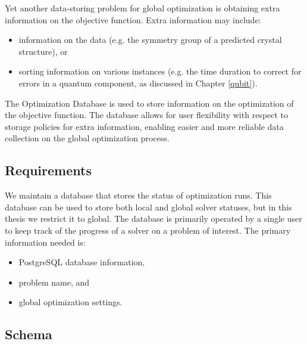 Yet another data-storing problem for global optimization is obtaining extra information on the objective function. Extra information may include:
\begin{itemize}
    \item information on the data (e.g. the symmetry group of a predicted crystal structure), or
    \item sorting information on various instances (e.g. the time duration to correct for errors in a quantum component, as discussed in Chapter \ref{qubit}).
\end{itemize}
The Optimization Database is used to store information on the optimization of the objective function. The database allows for user flexibility with respect to storage policies for extra information, enabling easier and more reliable data collection on the global optimization process. 

\subsection{Requirements}

We maintain a database that stores the status of optimization runs. This database can be used to store both local and global solver statuses, but in this thesis we restrict it to global. The database is primarily operated by a single user to keep track of the progress of a solver on a problem of interest. The primary information needed is:
\begin{itemize}
    \item PostgreSQL database information, 
    \item problem name, and 
    \item global optimization settings.
\end{itemize}

\subsection{Schema}

